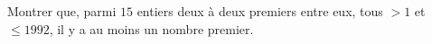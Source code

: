 Montrer que, parmi $15$ entiers deux à deux premiers entre eux, tous $> 1$ et $\leq 1992$, il y a au moins un nombre premier.
